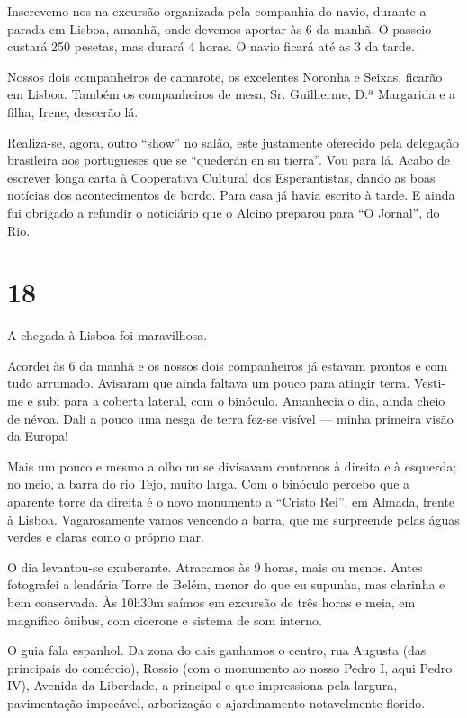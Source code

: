 Inscrevemo-nos na excursão organizada pela companhia do navio, durante a parada em Lisboa, amanhã, onde devemos aportar às 6 da manhã. O passeio custará 250 pesetas, mas durará 4 horas. O navio ficará até as 3 da tarde.

Nossos dois companheiros de camarote, os excelentes Noronha e Seixas, ficarão em Lisboa. Também os companheiros de mesa, Sr. Guilherme, D.ª Margarida e a filha, Irene, descerão lá.

Realiza-se, agora, outro ``show'' no salão, este justamente oferecido pela delegação brasileira aos portugueses que se ``quederán en su tierra''. Vou para lá. Acabo de escrever longa carta à Cooperativa Cultural dos Esperantistas, dando as boas notícias dos acontecimentos de bordo. Para casa já havia escrito à tarde. E ainda fui obrigado a refundir o noticiário que o Alcino preparou para ``O Jornal'', do Rio.

\section*{18 \adfflatleafright {}}

A chegada à Lisboa foi maravilhosa.

Acordei às 6 da manhã e os nossos dois companheiros já estavam prontos e com tudo arrumado. Avisaram que ainda faltava um pouco para atingir terra. Vesti-me e subi para a coberta lateral, com o binóculo. Amanhecia o dia, ainda cheio de névoa. Dali a pouco uma nesga de terra fez-se visível --- minha primeira visão da Europa!

Mais um pouco e mesmo a olho nu se divisavam contornos à direita e à esquerda; no meio, a barra do rio Tejo, muito larga. Com o binóculo percebo que a aparente torre da direita é o novo monumento a ``Cristo Rei'', em Almada, frente à Lisboa. Vagarosamente vamos vencendo a barra, que me surpreende pelas águas verdes e claras como o próprio mar.

O dia levantou-se exuberante. Atracamos às 9 horas, mais ou menos. Antes fotografei a lendária Torre de Belém, menor do que eu supunha, mas clarinha e bem conservada. Às 10h30m saímos em excursão de três horas e meia, em magnífico ônibus, com cicerone e sistema de som interno.

O guia fala espanhol. Da zona do cais ganhamos o centro, rua Augusta (das principais do comércio), Rossio (com o monumento ao nosso Pedro I, aqui Pedro IV), Avenida da Liberdade, a principal e que impressiona pela largura, pavimentação impecável, arborização e ajardinamento notavelmente florido.

